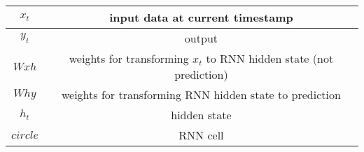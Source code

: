 \begin{table}[htb]   
\begin{center}   
\label{table:1} 
\begin{tabular}{|c|c|}   
\hline   \textbf{$x_t$} &  input data at current timestamp\\   
\hline   \textbf{$y_t$} & output  \\ 
\hline   \textbf{$Wxh$} & weights for transforming $x_t$ to RNN hidden state (not prediction)  \\  
\hline   \textbf{$Why$} & weights for transforming RNN hidden state to prediction  \\    
\hline   \textbf{$h_t$} & hidden state  \\ 
\hline   \textbf{$circle$} & RNN cell  \\   
\hline   
\end{tabular}   
\end{center}   
\end{table}

%
%
%

